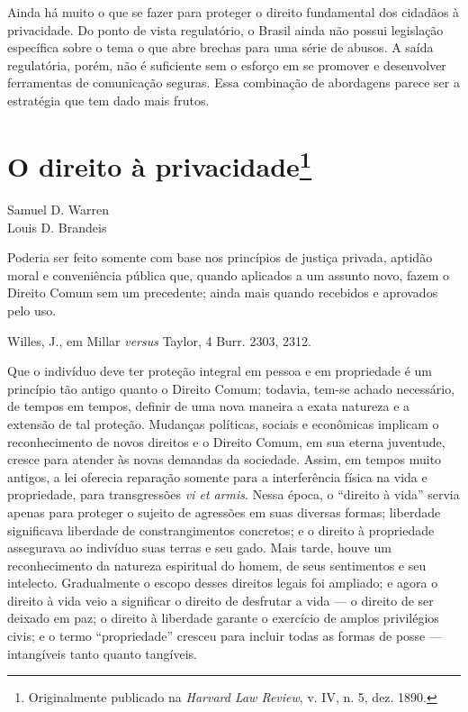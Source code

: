 Ainda há muito o que se fazer para proteger o direito fundamental dos
cidadãos à privacidade. Do ponto de vista regulatório, o Brasil ainda
não possui legislação específica sobre o tema o que abre brechas para
uma série de abusos. A saída regulatória, porém, não é suficiente sem o
esforço em se promover e desenvolver ferramentas de comunicação seguras.
Essa combinação de abordagens parece ser a estratégia que tem dado mais
frutos.

\chapter{O direito à privacidade\footnote{Originalmente publicado na \emph{Harvard
  Law Review}, v. IV, n. 5, dez. 1890.}}\label{o-direito-uxe0-privacidade}

Samuel D. Warren\\
Louis D. Brandeis

Poderia ser feito somente com base nos princípios de justiça privada,
aptidão moral e conveniência pública que, quando aplicados a um assunto
novo, fazem o Direito Comum sem um precedente; ainda mais quando
recebidos e aprovados pelo uso.

Willes, J., em Millar \emph{versus} Taylor, 4 Burr. 2303, 2312.

Que o indivíduo deve ter proteção integral em pessoa e em propriedade é
um princípio tão antigo quanto o Direito Comum; todavia, tem-se achado
necessário, de tempos em tempos, definir de uma nova maneira a exata
natureza e a extensão de tal proteção. Mudanças políticas, sociais e
econômicas implicam o reconhecimento de novos direitos e o Direito
Comum, em sua eterna juventude, cresce para atender às novas demandas da
sociedade. Assim, em tempos muito antigos, a lei oferecia reparação
somente para a interferência física na vida e propriedade, para
transgressões \emph{vi et armis}. Nessa época, o ``direito à vida''
servia apenas para proteger o sujeito de agressões em suas diversas
formas; liberdade significava liberdade de constrangimentos concretos; e
o direito à propriedade assegurava ao indivíduo suas terras e seu gado.
Mais tarde, houve um reconhecimento da natureza espiritual do homem, de
seus sentimentos e seu intelecto. Gradualmente o escopo desses direitos
legais foi ampliado; e agora o direito à vida veio a significar o
direito de desfrutar a vida --- o direito de ser deixado em paz; o
direito à liberdade garante o exercício de amplos privilégios civis; e o
termo ``propriedade'' cresceu para incluir todas as formas de posse ---
intangíveis tanto quanto tangíveis.

